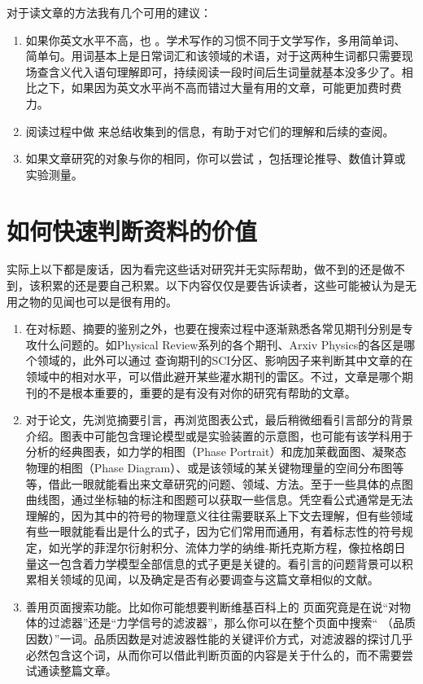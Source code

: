 \documentclass[a4paper,10pt,english]{sphinxmanual}
\begin{document}
对于读文章的方法我有几个可用的建议：
\begin{enumerate}
\item {} 
如果你英文水平不高，也  。学术写作的习惯不同于文学写作，多用简单词、简单句。用词基本上是日常词汇和该领域的术语，对于这两种生词都只需要现场查含义代入语句理解即可，持续阅读一段时间后生词量就基本没多少了。相比之下，如果因为英文水平尚不高而错过大量有用的文章，可能更加费时费力。

\item {} 
阅读过程中做  来总结收集到的信息，有助于对它们的理解和后续的查阅。

\item {} 
如果文章研究的对象与你的相同，你可以尝试  ，包括理论推导、数值计算或实验测量。

\end{enumerate}


\section{如何快速判断资料的价值}
\label{\detokenize{4. GetInfo:id4}}
实际上以下都是废话，因为看完这些话对研究并无实际帮助，做不到的还是做不到，该积累的还是要自己积累。以下内容仅仅是要告诉读者，这些可能被认为是无用之物的见闻也可以是很有用的。
\begin{enumerate}
\item {} 
在对标题、摘要的鉴别之外，也要在搜索过程中逐渐熟悉各常见期刊分别是专攻什么问题的。如Physical Review系列的各个期刊、Arxiv Physics的各区是哪个领域的，此外可以通过  查询期刊的SCI分区、影响因子来判断其中文章的在领域中的相对水平，可以借此避开某些灌水期刊的雷区。不过，文章是哪个期刊的不是根本重要的，重要的是有没有对你的研究有帮助的文章。

\item {} 
对于论文，先浏览摘要引言，再浏览图表公式，最后稍微细看引言部分的背景介绍。图表中可能包含理论模型或是实验装置的示意图，也可能有该学科用于分析的经典图表，如力学的相图（Phase Portrait）和庞加莱截面图、凝聚态物理的相图（Phase Diagram）、或是该领域的某关键物理量的空间分布图等等，借此一眼就能看出来文章研究的问题、领域、方法。至于一些具体的点图曲线图，通过坐标轴的标注和图题可以获取一些信息。凭空看公式通常是无法理解的，因为其中的符号的物理意义往往需要联系上下文去理解，但有些领域有些一眼就能看出是什么的式子，因为它们常用而通用，有着标志性的符号规定，如光学的菲涅尔衍射积分、流体力学的纳维-斯托克斯方程，像拉格朗日量这一包含着力学模型全部信息的式子更是关键的。看引言的问题背景可以积累相关领域的见闻，以及确定是否有必要调查与这篇文章相似的文献。

\item {} 
善用页面搜索功能。比如你可能想要判断维基百科上的  页面究竟是在说“对物体的过滤器”还是“力学信号的滤波器”，那么你可以在整个页面中搜索“  （品质因数）”一词。品质因数是对滤波器性能的关键评价方式，对滤波器的探讨几乎必然包含这个词，从而你可以借此判断页面的内容是关于什么的，而不需要尝试通读整篇文章。

\end{enumerate}
\end{document}
